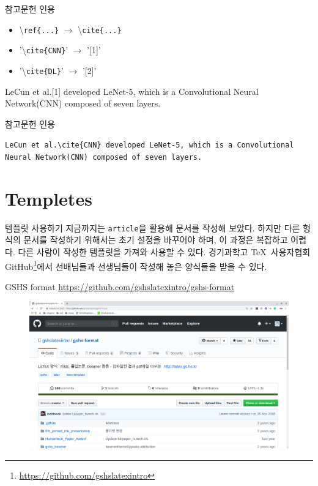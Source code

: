 \documentclass[12pt]{gshs_lecture}
\newenvironment{codeblock}[1]{
	\begin{block}{#1}
		\setstretch{1.0}
		\begin{small}
}{
		\end{small}
	\end{block}
}
\begin{document}
\begin{frame}[t]{참고문헌 인용}
	
	\begin{itemize}
		\item \textbackslash \texttt{ref\{...\}} $\rightarrow$ \textbackslash \texttt{cite\{...\}}
		\item '\textbackslash \texttt{cite\{CNN\}}' $\rightarrow$ '[1]'
		\item '\textbackslash \texttt{cite\{DL\}}' $\rightarrow$ '[2]'
	\end{itemize}
	
	\vskip 1pc
	
	LeCun et al.[1] developed LeNet-5, which is a Convolutional Neural Network(CNN) composed of seven layers.
	
	\begin{codeblock}{참고문헌 인용}
		\texttt{LeCun et al.\textbackslash cite\{CNN\} developed LeNet-5, which is a Convolutional Neural Network(CNN) composed of seven layers.}
	\end{codeblock}
\end{frame}

\section{Templetes}

\begin{frame}[t]{템플릿 사용하기}
	지금까지는 \texttt{article}을 활용해 문서를 작성해 보았다. 하지만 다른 형식의 문서를 작성하기 위해서는 초기 설정을 바꾸어야 하며, 이 과정은 복잡하고 어렵다.
	\vskip 1pc
	다른 사람이 작성한 템플릿을 가져와 사용할 수 있다.
	\vskip 1pc
	경기과학고 \TeX\ 사용자협회 GitHub\footnote[frame]{\url{https://github.com/gshslatexintro}}에서 선배님들과 선생님들이 작성해 놓은 양식들을 받을 수 있다.
\end{frame}

\begin{frame}[t]{GSHS format}
	\url{https://github.com/gshslatexintro/gshs-format}
	\begin{figure}[h]
		\includegraphics[width=\textwidth]{./pictures/github.png}
	\end{figure}
\end{frame}
\end{document}
